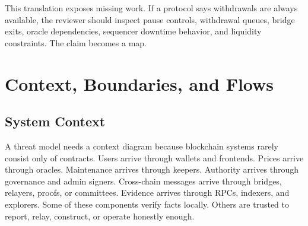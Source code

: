 This translation exposes missing work. If a protocol says withdrawals are always available, the reviewer should inspect pause controls, withdrawal queues, bridge exits, oracle dependencies, sequencer downtime behavior, and liquidity constraints. The claim becomes a map.

\section{Context, Boundaries, and Flows}

\subsection{System Context}

A threat model needs a context diagram because blockchain systems rarely consist only of contracts. Users arrive through wallets and frontends. Prices arrive through oracles. Maintenance arrives through keepers. Authority arrives through governance and admin signers. Cross-chain messages arrive through bridges, relayers, proofs, or committees. Evidence arrives through RPCs, indexers, and explorers. Some of these components verify facts locally. Others are trusted to report, relay, construct, or operate honestly enough.

